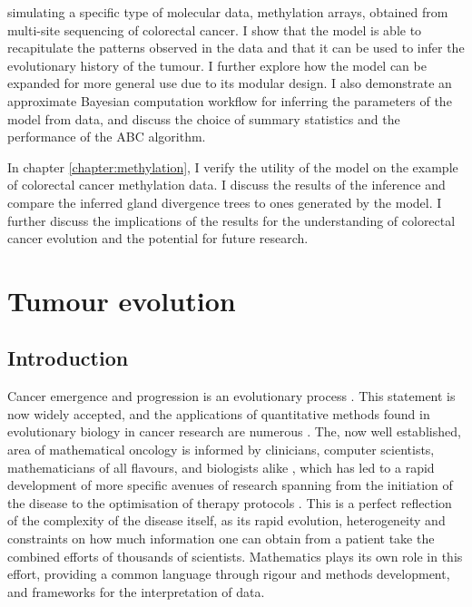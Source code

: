 simulating a specific type of molecular data, methylation arrays, obtained from
multi-site sequencing of colorectal cancer. I show that the model is able to
recapitulate the patterns observed in the data and that it can be used to infer
the evolutionary history of the tumour. I further explore how the model can be
expanded for more general use due to its modular design. I also demonstrate an
approximate Bayesian computation workflow for inferring the parameters of the
model from data, and discuss the choice of summary statistics and the
performance of the ABC algorithm.\par
In chapter \ref{chapter:methylation}, I verify the utility of the model on the
example of colorectal cancer methylation data. I discuss the results of the
inference and compare the inferred gland divergence trees to ones generated by
the model. I further discuss the implications of the results for the
understanding of colorectal cancer evolution and the potential for future
research. \par


\section{Tumour evolution}
\subsection{Introduction}
Cancer emergence and progression is an evolutionary process
\cite{nowell_clonal_1976, merlo_cancer_2006}. This statement is now widely
accepted, and the applications of quantitative methods found in evolutionary
biology in cancer research are numerous \cite{rockne_2019_2019,
yin_review_2019, kourou_applied_2021}. The, now well established, area of
mathematical oncology is informed by clinicians, computer scientists,
mathematicians of all flavours, and biologists alike
\cite{bull_hallmarks_2022}, which has led to a rapid development of more
specific avenues of research spanning from the initiation of the disease
\cite{paterson_mathematical_2020} to the optimisation of therapy protocols
\cite{west_survey_2023}. This is a perfect reflection of the complexity of the
disease itself, as its rapid evolution, heterogeneity and constraints on how
much information one can obtain from a patient take the combined efforts of
thousands of scientists. Mathematics plays its own role in this effort,
providing a common language through rigour and methods development, and
frameworks for the interpretation of data.

